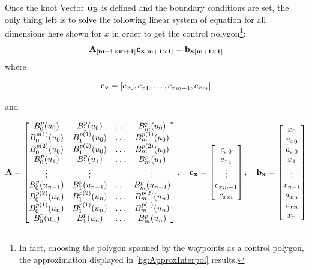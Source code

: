 Once the knot Vector ${\bf u_B}$ is defined and the boundary conditions are set, the only thing left is to solve the following linear system of equation for all dimensions here shown for $x$ in order to get the control polygon\footnote{In fact, choosing the polygon spanned by the waypoints as a control polygon, the approximation displayed in \ref{fig:ApproxInterpol} results.}:
\begin{equation}
{\bf A_{[m+1\times m+1] }}{\bf {c_x}_{[m+1\times 1]}}={\bf {b_x}_{[m+1 \times 1]}}
\end{equation}
where


\begin{equation*}
    {\bf c_x} = [ {c_x}_{0}, {c_x}_{1}, \ldots, {c_x}_{m-1}, {c_x}_{m}]
\end{equation*}

and

\begin{equation*}
{\bf A}=   \begin{bmatrix} %
      B_0^p(u_0)        & B_1^p(u_0)         & \ldots & B_m^p(u_0) \\
      B_0^{p(1)}(u_0) & B_1^{p(1)}(u_0) & \ldots & B_m^{p(1)}(u_0) \\
      B_0^{p(2)}(u_0) & B_1^{p(2)}(u_0) & \ldots & B_m^{p(2)}(u_0) \\
      B_0^p(u_1)         & B_1^p(u_1)         & \ldots & B_m^p(u_1) \\
      \vdots			&\vdots		     &            &\vdots \\
      B_0^p(u_{n-1})        & B_1^p(u_{n-1})         & \ldots & B_m^p(u_{n-1}) \\
      B_0^{p(2)}(u_n) & B_1^{p(2)}(u_n) & \ldots & B_m^{p(2)}(u_n) \\
      B_0^{p(1)}(u_n) & B_1^{p(1)}(u_n) & \ldots & B_m^{p(1)}(u_n) \\
      B_0^p(u_n)         & B_1^p(u_n)         & \ldots & B_m^p(u_n) \\
      
   \end{bmatrix},
   \quad 
   {\bf c_x} = \begin{bmatrix}
   {c_x}_0\\
   {c_x}_1\\
   \vdots \\
   {c_x}_{m-1}\\
   {c_x}_{m} 
    \end{bmatrix},
    \quad
   {\bf b_x} =  \begin{bmatrix}
   x_0\\
   {v_x}_0\\
   {a_x}_0\\
   x_1\\
   \vdots \\
   x_{n-1} \\
   {a_x}_n\\
   {v_x}_n\\
   x_n
    \end{bmatrix}
\end{equation*}
 






